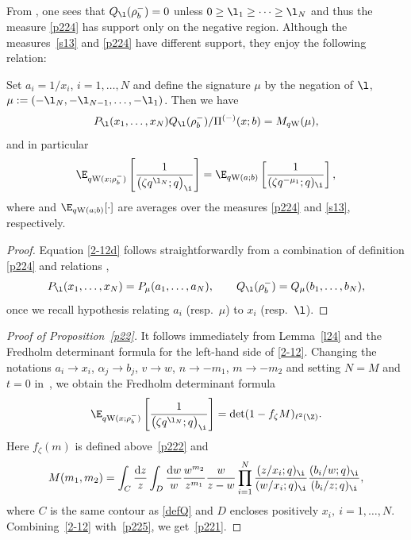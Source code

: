 From \cite[Lemma 3.3, equation~(3.15)]{ImamuraSasamoto2019qTASEPtheta}, one sees that $Q_{\l}(\rho_b^-)=0$ unless
$0\ge \l_1\ge\cdots \ge \l_N$ and thus the measure
\eqref{p224} has support only on the negative region. Although the measures~\eqref{s13} and \eqref{p224} have different support, they enjoy the following relation:
\begin{Lemma} \label{l24}
Set $a_i=1/x_i$, $i=1,\dots,N$ and define the signature $\mu$ by the negation of $\l$,
$\mu:=(-\l_N,-\l_{N-1},\dots,-\l_1)$.
 Then we have
\begin{align}
\label{2-12d}
 P_{\l}(x_1,\dots,x_N)Q_{\l}(\rho^{-}_b)/\Pi^{(-)}(x;b)
=
M_{q{\rm W}}(\mu),
 \end{align}
 and in particular
\begin{align}
\label{2-12}
 \E_{q{\rm W}(x;\rho_b^-)}\left[\frac{1}{\big(\zeta q^{\l_N};q\big)_{\i}}\right]
 =
 \E_{q{\rm W}(a;b)}\left[\frac{1}{(\zeta q^{-\mu_1};q)_{\i}}\right],
\end{align}
 where 
 and $\E_{q{\rm W}(a;b)}[\cdot]$
 are averages over the measures
 \eqref{p224} and \eqref{s13}, respectively.
\end{Lemma}
\begin{proof}
 Equation \eqref{2-12d} follows straightforwardly from a combination of definition \eqref{p224}
 and relations \cite[equations~(3.14) and (3.15)]{ImamuraSasamoto2019qTASEPtheta},
 \[%
 P_{\l}(x_1,\dots,x_N)=P_{\mu} (a_1,\dots,a_N),
 \qquad
 Q_{\l}(\rho^-_b)=Q_{\mu}(b_1,\dots,b_N),
 \]
 once we recall hypothesis relating $a_i$ (resp.\ $\mu$)
 to $x_i$ (resp.\ $\l$).
\end{proof}

\begin{proof}[Proof of Proposition~\ref{p22}]
 It follows immediately from Lemma~\ref{l24}
 and the Fredholm determinant formula
 for the left-hand side of \eqref{2-12}.
 Changing the notations $a_i\rightarrow x_i$,
 $\alpha_j\rightarrow b_j$,
 $v\rightarrow w$,
 $n\rightarrow -m_1$, $m\rightarrow -m_2$
 and setting $N=M$ and $t=0$
 in~\cite[equation~(4.37)]{ImamuraSasamoto2019qTASEPtheta},
 we obtain the Fredholm determinant formula
\begin{align}
\label{p225}
\E_{q\text{W}(x;\rho_b^-)}\left[\frac{1}{\big(\zeta q^{\l_N};q\big)_{\i}}\right]
=
\det(1-f_{\zeta} M)_{\ell^2(\Z)}.
\end{align}
Here $f_{\zeta}(m)$ is defined above~\eqref{p222}
and
\begin{align*}%
M(m_1,m_2)=
\int_C\frac{{\rm d}z}{z}\int_{D}\frac{{\rm d}w}{w}
\frac{w^{m_2}}{z^{m_1}}
\frac{w}{z-w}
\prod_{i=1}^N
\frac{(z/x_i;q)_{\i}}{(w/x_i;q)_{\i}}
\frac{(b_i/w;q)_{\i}}{(b_i/z;q)_{\i}},
\end{align*}
where $C$ is the same contour as \eqref{defQ} and $D$ encloses positively
$x_i,~i=1,\dots,N$.
Combining~\eqref{2-12} with~\eqref{p225},
we get~\eqref{p221}.
\end{proof}


